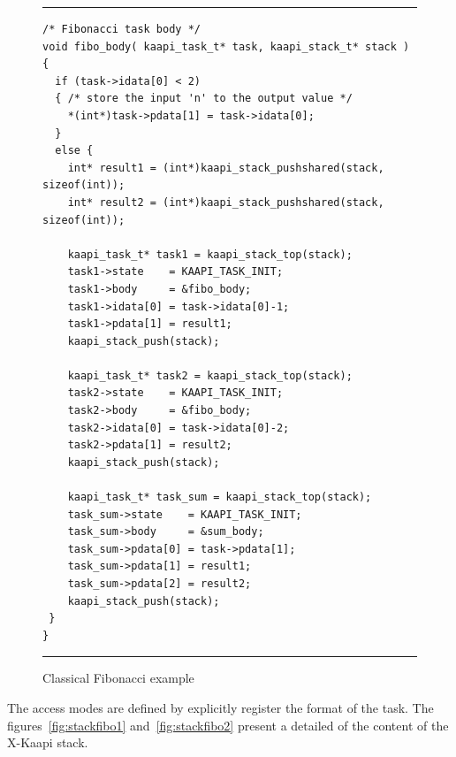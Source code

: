 \documentclass[12pt]{report}
\newcommand{\kaapi}{\textsc{X}-Kaapi\xspace}
\begin{document}
\begin{figure}[!h]
\hrule
\small
\begin{verbatim}
/* Fibonacci task body */
void fibo_body( kaapi_task_t* task, kaapi_stack_t* stack )
{
  if (task->idata[0] < 2)
  { /* store the input 'n' to the output value */
    *(int*)task->pdata[1] = task->idata[0];
  }
  else {
    int* result1 = (int*)kaapi_stack_pushshared(stack, sizeof(int));
    int* result2 = (int*)kaapi_stack_pushshared(stack, sizeof(int));

    kaapi_task_t* task1 = kaapi_stack_top(stack);
    task1->state    = KAAPI_TASK_INIT;
    task1->body     = &fibo_body;
    task1->idata[0] = task->idata[0]-1;
    task1->pdata[1] = result1;
    kaapi_stack_push(stack);

    kaapi_task_t* task2 = kaapi_stack_top(stack);
    task2->state    = KAAPI_TASK_INIT;
    task2->body     = &fibo_body;
    task2->idata[0] = task->idata[0]-2;
    task2->pdata[1] = result2;
    kaapi_stack_push(stack);

    kaapi_task_t* task_sum = kaapi_stack_top(stack);
    task_sum->state    = KAAPI_TASK_INIT;
    task_sum->body     = &sum_body;
    task_sum->pdata[0] = task->pdata[1];
    task_sum->pdata[1] = result1;
    task_sum->pdata[2] = result2;
    kaapi_stack_push(stack);    
 }
}
\end{verbatim}
\hrule
\caption{Classical Fibonacci example}
\label{fig:fibo}
\end{figure}
The access modes are defined by explicitly register the format of the task.
The figures~\ref{fig:stackfibo1} and~\ref{fig:stackfibo2} present a detailed of the content of the \kaapi stack.
\end{document}
